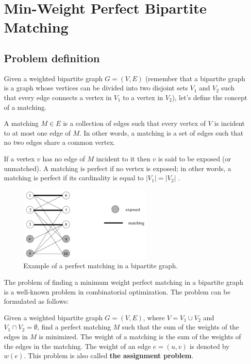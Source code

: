 \chapter{Min-Weight Perfect Bipartite Matching} \label{chp:min_weight_perfect_bipartite_matching}

\section{Problem definition}
Given a weighted bipartite graph $G = (V, E)$ (remember that a bipartite graph is a graph whose vertices can be divided into two disjoint sets $V_1$ and $V_2$ such that every edge connects a vertex in $V_1$ to a vertex in $V_2$), let's define the concept of a matching.
\begin{definition}[Matching] \label{def:matching}
    A matching $M \in E$ is a collection of edges such that every vertex of $V$ is incident to at most one edge of $M$. In other words, a matching is a set of edges such that no two edges share a common vertex. 
\end{definition}

If a vertex $v$ has no edge of $M$ incident to it then $v$ is said to be exposed (or unmatched). A matching is perfect if no vertex is exposed; in other words, a matching is perfect if its cardinality is equal to $|V_1| = |V_2|$ \cite{goemans2009matching}.

\begin{figure}[H]
    \centering
    \includegraphics[width=0.6\textwidth]{Immagini/matching_example.png}
    \caption{Example of a perfect matching in a bipartite graph.}
    \label{fig:matching_example}
\end{figure}

The problem of finding a minimum weight perfect matching in a bipartite graph is a well-known problem in combinatorial optimization. The problem can be formulated as follows: 

\begin{definition} \label{def:mwpbm}
    Given a weighted bipartite graph $G = (V, E)$, where $V = V_1 \cup V_2$ and $V_1 \cap V_2 = \emptyset$, find a perfect matching $M$ such that the sum of the weights of the edges in $M$ is minimized. The weight of a matching is the sum of the weights of the edges in the matching. The weight of an edge $e = (u, v)$ is denoted by $w(e)$. This problem is also called \textbf{the assignment problem}.
\end{definition}

